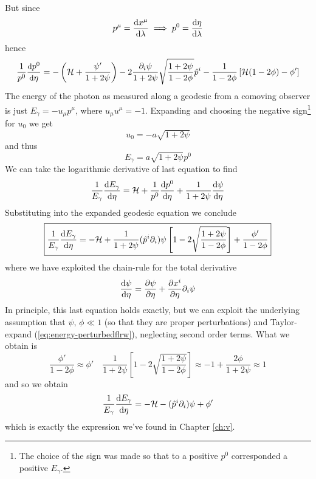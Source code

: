 But since 
\begin{equation}
    p^{\mu} = \frac{\text{d}x^{\mu}}{\text{d}\lambda} \implies p^{0} = \frac{\text{d}\eta}{\text{d}\lambda}
\end{equation}
hence
\begin{equation}
    \small{
    \frac{1}{p^{0}}\frac{\text{d}p^{0}}{\text{d}\eta} = -\left(\mathcal{H} + \frac{\psi'}{1+2\psi}\right)-2\frac{\partial_{i}\psi}{1+2\psi}\sqrt{\frac{1+2\psi}{1-2\phi}}\hat{p}^{i}-\frac{1}{1-2\phi}\left[\mathcal{H}(1-2\phi)-\phi'\right]
    }
\end{equation}
The energy of the photon as measured along a geodesic from a comoving observer is just $E_{\gamma} = -u_{\mu}p^{\mu}$, where $u_{\mu}u^{\mu} = -1$. Expanding and choosing the negative sign\footnote{The choice of the sign was made so that to a positive $p^{0}$ corresponded a positive $E_{\gamma}$.} for $u_{0}$ we get 
\begin{equation}
    u_{0} = -a\sqrt{1+2\psi}
\end{equation}
and thus 
\begin{equation}
    E_{\gamma} = a\sqrt{1+2\psi}p^{0}
\end{equation}
We can take the logarithmic derivative of last equation to find
\begin{equation}
    \frac{1}{E_{\gamma}}\frac{\text{d}E_{\gamma}}{\text{d}\eta} = \mathcal{H} + \frac{1}{p^{0}}\frac{\text{d}p^{0}}{\text{d}\eta}+\frac{1}{1+2\psi}\frac{\text{d}\psi}{\text{d}\eta}
\end{equation}
Substituting into the expanded geodesic equation we conclude
\begin{equation}
    \boxed{
        \frac{1}{E_{\gamma}}\frac{\text{d}E_{\gamma}}{\text{d}\eta} = - \mathcal{H}+\frac{1}{1+2\psi}(\hat{p}^{i}\partial_{i})\psi\left[1-2\sqrt{\frac{1+2\psi}{1-2\phi}}\right] + \frac{\phi'}{1-2\phi}
    }
    \label{eq:energy-perturbedflrw}
\end{equation}
where we have exploited the chain-rule for the total derivative
\begin{equation}
    \frac{\text{d}\psi}{\text{d}\eta} = \frac{\partial \psi}{\partial \eta} + \frac{\partial x^{i}}{\partial \eta}\partial_{i}\psi
\end{equation}
In principle, this last equation holds exactly, but we can exploit the underlying assumption that $\psi,\,\phi \ll 1$ (so that they are proper perturbations) and Taylor-expand (\ref{eq:energy-perturbedflrw}), neglecting second order terms. What we obtain is
\begin{equation}
    \frac{\phi'}{1-2\phi} \approx \phi' \quad \frac{1}{1+2\psi}\left[1-2\sqrt{\frac{1+2\psi}{1-2\phi}}\right] \approx -1 +\frac{2\phi}{1+2\psi} \approx 1
\end{equation}
and so we obtain 
\begin{equation}
    \frac{1}{E_{\gamma}}\frac{\text{d}E_{\gamma}}{\text{d}\eta} = - \mathcal{H}-(\hat{p}^{i}\partial_{i})\psi + \phi'
\end{equation}
which is exactly the expression we've found in Chapter \ref{ch:v}.
